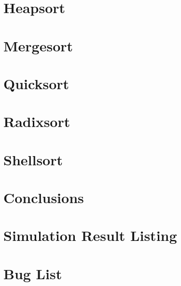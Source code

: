 \documentclass[dvips]{report}
\begin{document}


\chapter{Heapsort}



\chapter{Mergesort}



\chapter{Quicksort}



\chapter{Radixsort}



\chapter{Shellsort}



\chapter{Conclusions}



\appendix

\chapter{Simulation Result Listing}


%

\chapter{Bug List}


\nocite{*}
\end{document}
